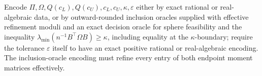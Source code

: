 Encode \(\Pi,\Omega,Q(c_L),Q(c_U),c_L,c_U,\kappa,\varepsilon\) either by exact rational or real-algebraic data, or by outward-rounded inclusion oracles supplied with effective refinement moduli and an exact decision oracle for sphere feasibility and the inequality \(\lambda_{\min}(n^{-1}B^{\top}\Omega B)\ge\kappa\), including equality at the \(\kappa\)-boundary; require the tolerance \(\varepsilon\) itself to have an exact positive rational or real-algebraic encoding. The inclusion-oracle encoding must refine every entry of both endpoint moment matrices effectively.